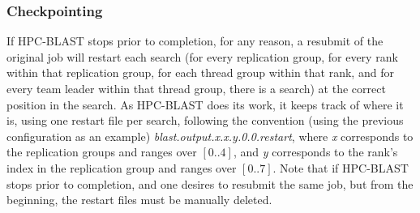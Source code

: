 \documentclass[10pt]{article}
\begin{document}



\subsubsection{Checkpointing}\label{sssec:checkpointing}

If HPC-BLAST stops prior to completion, for any reason, a resubmit of the original job will restart each search (for every replication group, for every 
rank within that replication group, for each thread group within that rank, and for every team leader within that thread group, there is a search) at the 
correct position in the search.  As HPC-BLAST does its work, it keeps track of where it is, using one restart file per search, following 
the convention (using the previous configuration as an example) 
\emph{blast.output.x.x.y.0.0.restart}, where  \emph{x} corresponds to the replication groups and ranges over \([0..4]\), and \emph{y} corresponds to the rank's index in the replication group
and ranges over \([0..7]\).  Note that if HPC-BLAST stops prior to completion, and one desires to resubmit the same job, but from the beginning, the restart 
files must be manually deleted.
\end{document}
